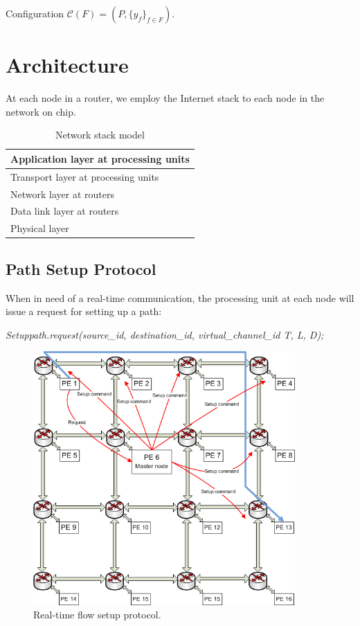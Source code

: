 \documentclass[a4]{article}
\begin{document}
Configuration $\mathcal{C}(F)=(P, \{y_f\}_{f \in F})$.
\section{Architecture}
At each node in a router, we employ the Internet stack to each node in the 
network on chip.
\begin{table}[h]
\begin{center}
  \begin{tabular}{ | l | }
    \hline
    Application layer at processing units \\ \hline
    Transport layer at processing units \\ \hline
    Network layer at routers \\ \hline
	Data link layer at routers \\ \hline
	Physical layer \\
    \hline
  \end{tabular}
\end{center}
\caption{Network stack model}
\label{table:NetworkStack}
\end{table}

\subsection{Path Setup Protocol}
When in need of a real-time communication, the processing unit at each node 
will issue a request for setting up a path:

{\em Setuppath.request(source\_id, destination\_id, virtual\_channel\_id T, L,
D);}

\begin{figure}[htp]
\centering
\includegraphics[width=10cm]{pics/Protocol2}
\caption[Setup request for a real-time flow.]
{Real-time flow setup protocol.}\label{fig:ReqSetup}
\end{figure}
\end{document}
